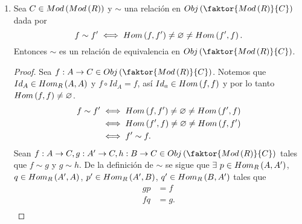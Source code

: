 \documentclass{article}
\begin{document}
\begin{enumerate}[label=\textbf{Ej \arabic*.}]
\begin{proof}
			$g\colon f\longrightarrow f$ es un isomorfismo en \,\,$\faktor{Mod(R)}{C}$\,\,\\
			$\iff \,\,\,\exists g^{-1}\colon f\longrightarrow f$  tal que $g^{-1}g=1_f$ y $gg^{-1}=1_f$\\
			$\iff \,\,\,\exists g^{-1}\colon f\longrightarrow f$  tal que $g^{-1}g=Id_B$ y $gg^{-1}=Id_B$\\
			$\iff \,\,\,\exists g^{-1}\in \operatorname{Hom}_R(B,B)$ tal que $g^{-1}g=Id_B$, $gg^{-1}=Id_B$y  $f=fg^{-1}$\\
			$\iff \,\,\,g\colon B\longrightarrow B$ es isomorfismo en $Mod(R)$ tal que $fg=f$.
		\end{proof} 
		\item Sea $C\in Mod\left(Mod\left(R\right)\right)$ y $\sim$ una relación en $Obj\lrprth{\faktor{Mod\lrprth{R}}{C}}$ dada por
		\begin{equation*}
			f\sim f'\iff Hom\left(f,f'\right)\neq\varnothing\neq Hom\left(f',f\right).
		\end{equation*}
		Entonces $\sim$ es un relación de equivalencia en $Obj\lrprth{\faktor{Mod\lrprth{R}}{C}}$.
		\begin{proof}
			 Sea $f:A\to C\in Obj\lrprth{\faktor{Mod\lrprth{R}}{C}}$. Notemos que $Id_A\in Hom_{R}\left(A,A\right)$ y $f\circ Id_A=f$, así $Id_a\in Hom\left(f,f\right)$ y por lo tanto $Hom\left(f,f\right)\neq\varnothing$.\\
			\begin{align*}
				f\sim f'&\iff  Hom\left(f,f'\right)\neq\varnothing\neq Hom\left(f',f\right)\\
				&\iff  Hom\left(f',f\right)\neq\varnothing\neq Hom\left(f,f'\right)\\
				&\iff f'\sim f.
			\end{align*}
			 Sean $f:A\to C,g:A'\to C, h:B\to C\in Obj\lrprth{\faktor{Mod\lrprth{R}}{C}}$ tales que $f\sim g$ y $g\sim h$. De la definición de $\sim$ se sigue que $\exists\ p\in\ringmodhom{R}{A}{A'}$, $q\in Hom_{R}\left(A',A\right)$, $p'\in Hom_{R}\left(A',B\right)$, $q'\in Hom_{R}\left(B,A'\right)$ tales que
			\begin{equation*}\label{fsimg}\tag{*}
				\begin{split}
					gp&=f\\
					fq&=g.
				\end{split}
			\end{equation*}
			\begin{equation*}\label{gsimh}\tag{**}
				\begin{split}

\end{split}
\end{equation*}
\end{proof}
\end{enumerate}
\end{document}
